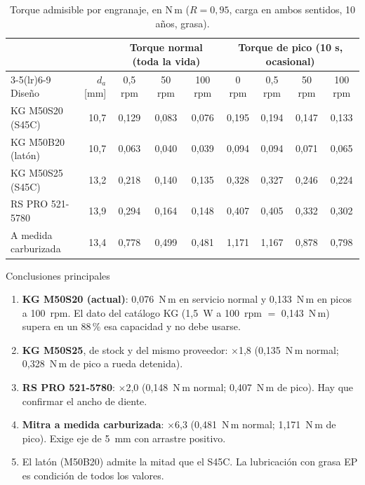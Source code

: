 \documentclass[11pt,a4paper]{article}
\begin{document}
\begin{table}[H]\centering\small\setlength{\tabcolsep}{4.5pt}
\caption{Torque admisible por engranaje, en N\,m ($R=0{,}95$, carga en ambos sentidos, 10 años, grasa).}\label{tab:resumen}
\begin{tabular}{l r ccc cccc}
\toprule
 & & \multicolumn{3}{c}{Torque normal (toda la vida)} & \multicolumn{4}{c}{Torque de pico (10 s, ocasional)}\\
\cmidrule(lr){3-5}\cmidrule(lr){6-9}
Diseño & $d_a$ [mm] & 0,5 rpm & 50 rpm & 100 rpm & 0 rpm & 0,5 rpm & 50 rpm & 100 rpm\\
\midrule
KG M50S20 (S45C) & 10,7 & 0,129 & 0,083 & 0,076 & 0,195 & 0,194 & 0,147 & 0,133 \\
KG M50B20 (latón) & 10,7 & 0,063 & 0,040 & 0,039 & 0,094 & 0,094 & 0,071 & 0,065 \\
KG M50S25 (S45C) & 13,2 & 0,218 & 0,140 & 0,135 & 0,328 & 0,327 & 0,246 & 0,224 \\
RS PRO 521-5780 & 13,9 & 0,294 & 0,164 & 0,148 & 0,407 & 0,405 & 0,332 & 0,302 \\
A medida carburizada & 13,4 & 0,778 & 0,499 & 0,481 & 1,171 & 1,167 & 0,878 & 0,798 \\
\bottomrule\end{tabular}\end{table}


\begin{caja}{Conclusiones principales}
\begin{enumerate}[leftmargin=1.2em]
\item \textbf{KG M50S20 (actual)}: 0,076~N\,m en servicio normal y 0,133~N\,m en picos a 100~rpm.
El dato del catálogo KG (1,5~W a 100~rpm $=$ 0,143~N\,m) supera en un 88\,\% esa capacidad y no debe usarse.
\item \textbf{KG M50S25}, de stock y del mismo proveedor: $\times$1,8 (0,135~N\,m normal; 0,328~N\,m de pico a rueda detenida).
\item \textbf{RS PRO 521-5780}: $\times$2,0 (0,148~N\,m normal; 0,407~N\,m de pico). Hay que confirmar el ancho de diente.
\item \textbf{Mitra a medida carburizada}: $\times$6,3 (0,481~N\,m normal; 1,171~N\,m de pico). Exige eje de 5~mm con arrastre positivo.
\item El latón (M50B20) admite la mitad que el S45C. La lubricación con grasa EP es condición de todos los valores.
\end{enumerate}
\end{caja}
\end{document}
